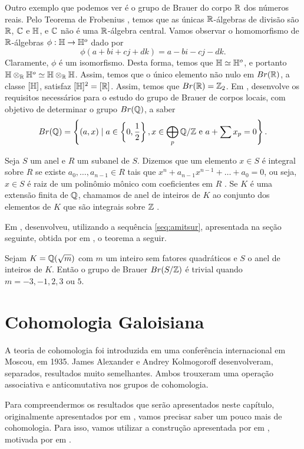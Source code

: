 Outro exemplo que podemos ver é o grupo de Brauer do corpo $\mathbb{R}$ dos números reais. Pelo Teorema de Frobenius \cite[Theorem 3.2.3., p.16]{oxford}, temos que as únicas $\mathbb{R}$-álgebras de divisão são $\mathbb{R}$, $\mathbb{C}$ e $\mathbb{H}$, e $\mathbb{C}$ não é uma $\mathbb{R}$-álgebra central. Vamos observar o homomorfismo de $\mathbb{R}$-álgebras $\phi: \mathbb{H} \rightarrow \mathbb{H}^o$ dado por \[\phi(a+bi+cj+dk) = a-bi-cj-dk.\] Claramente, $\phi$ é um isomorfismo. Desta forma, temos que $\mathbb{H} \simeq \mathbb{H}^o$, e portanto $\mathbb{H} \otimes_{\mathbb{R}} \mathbb{H}^o \simeq \mathbb{H} \otimes_{\mathbb{R}} \mathbb{H}$. Assim, temos que o único elemento não nulo em $Br(\mathbb{R})$, a classe $[\mathbb{H}]$, satisfaz $[\mathbb{H}]^2 = [\mathbb{R}]$. Assim, temos que $Br(\mathbb{R}) = \mathbb{Z}_2$. Em \cite{oxford}, \citeauthor{oxford} desenvolve os requisitos necessários para o estudo do grupo de Brauer de corpos locais, com objetivo de determinar o grupo $Br(\mathbb{Q})$, a saber \[Br(\mathbb{Q}) = \left\{(a,x) \mid a \in \left\{0, \frac{1}{2}\right\}, x \in  \bigoplus_p \mathbb{Q}/\mathbb{Z} \textrm{ e } a + \sum x_p = 0 \right\}.\]

Seja $S$ um anel e $R$ um subanel de $S$. Dizemos que um elemento $x \in S$ é integral sobre $R$ se existe $a_0,\dots,a_{n-1} \in R$ tais que $x^n + a_{n-1}x^{n-1} + \dots + a_0 =0$, ou seja, $x \in S$ é raiz de um polinômio mônico com coeficientes em $R$ \cite[p.43, Definição 2.1.1]{anelinteiro}. Se $K$ é uma extensão finita de $\mathbb{Q}$, chamamos de anel de inteiros de $K$ ao conjunto dos elementos de $K$ que são integrais sobre $\mathbb{Z}$ \cite[p.66]{anelinteiro}.\par 
Em \citeyear{integers}, \citeauthor{integers} desenvolveu, utilizando a sequência \eqref{seq:amitsur}, apresentada na seção seguinte, obtida por \citeauthor*{amitsur} em \cite{amitsur}, o teorema a seguir.
\begin{teo*}\cite[Theorem 5.0]{integers}
Sejam $K=\mathbb{Q}(\sqrt{m})$ com $m$ um inteiro sem fatores quadráticos e $S$ o anel de inteiros de $K$. Então o grupo de Brauer $Br(S/\mathbb{Z})$ é trivial quando $m=-3,-1,2,3$ ou $5$.
\end{teo*}


\section{Cohomologia Galoisiana} \label{sec:cohomgal}
A teoria de cohomologia foi introduzida em uma conferência internacional em Moscou, em 1935. James Alexander e Andrey Kolmogoroff desenvolveram, separados, resultados muito semelhantes. Ambos trouxeram uma operação associativa e anticomutativa nos grupos de cohomologia.

Para compreendermos os resultados que serão apresentados neste capítulo, originalmente apresentados por \citeauthor*{chr} em \cite[]{chr}, vamos precisar saber um pouco mais de cohomologia. Para isso, vamos utilizar a construção apresentada por \citeauthor{dis:cohomologia} em \cite[p.51]{dis:cohomologia}, motivada por \citeauthor{pre:cohomologia} em \cite{pre:cohomologia}.

